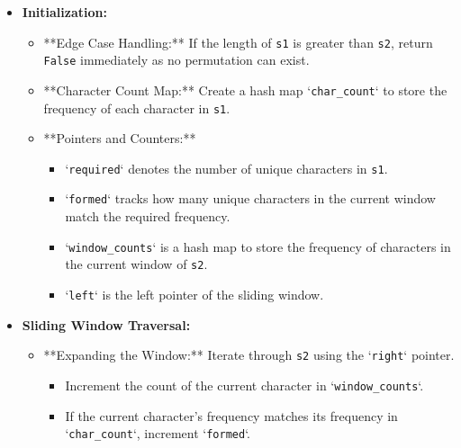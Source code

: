 \begin{itemize}
    \item \textbf{Initialization:}
    \begin{itemize}
        \item **Edge Case Handling:** If the length of \texttt{s1} is greater than \texttt{s2}, return \texttt{False} immediately as no permutation can exist.
        \item **Character Count Map:** Create a hash map `\texttt{char\_count}` to store the frequency of each character in \texttt{s1}.
        \item **Pointers and Counters:**
        \begin{itemize}
            \item `\texttt{required}` denotes the number of unique characters in \texttt{s1}.
            \item `\texttt{formed}` tracks how many unique characters in the current window match the required frequency.
            \item `\texttt{window\_counts}` is a hash map to store the frequency of characters in the current window of \texttt{s2}.
            \item `\texttt{left}` is the left pointer of the sliding window.
        \end{itemize}
    \end{itemize}
    
    \item \textbf{Sliding Window Traversal:}
    \begin{itemize}
        \item **Expanding the Window:** Iterate through \texttt{s2} using the `\texttt{right}` pointer.
            \begin{itemize}
                \item Increment the count of the current character in `\texttt{window\_counts}`.
                \item If the current character's frequency matches its frequency in `\texttt{char\_count}`, increment `\texttt{formed}`.
            \end{itemize}
        

\end{itemize}
\end{itemize}
